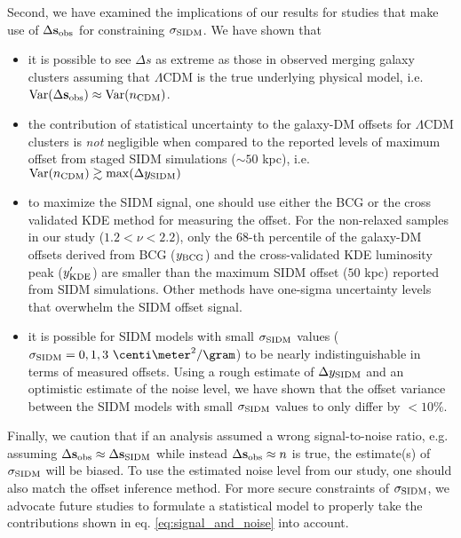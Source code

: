 Second, we have examined the implications of our results for studies that make use of
$\Delta {\bf s}_{\rm obs}$ for constraining $\sigma_{\rm SIDM}$. We have shown that 
\begin{itemize}
		\item it is possible to see $\Delta s$ as extreme as those in observed merging 
			galaxy clusters assuming that $\Lambda$CDM is the true underlying physical model, 
	i.e. $\mathrm{Var}(\Delta {\bf s}_{\rm obs}) \approx \mathrm{Var}(n_{\rm CDM})$.\\

		\item the contribution of statistical uncertainty to the galaxy-DM offsets 
			for $\Lambda$CDM clusters is {\it not} negligible when compared to the reported  
			levels of maximum offset from staged SIDM simulations ($\sim 50$ kpc),
			i.e. $\mathrm{Var}(n_{\rm CDM}) \gtrsim \max(\Delta y_{{\rm SIDM}})$
			\\ 
		
		\item to maximize the SIDM signal, one should use either the BCG or the
			cross validated KDE method for measuring the offset.
			For the non-relaxed samples in our study ($1.2 < \nu < 2.2$),
		  only the 68-th percentile of the galaxy-DM offsets derived from BCG ($y_{\rm BCG}$) and 
			the cross-validated KDE luminosity peak	($y_{\rm KDE}'$)
			are smaller than the maximum SIDM offset ($50$ kpc) reported from SIDM simulations. 
			Other methods have one-sigma uncertainty levels that overwhelm the
			SIDM offset signal.\\ 

		\item it is possible for SIDM models with small $\sigma_{\rm SIDM}$ values 
			($\sigma_\SIDM = 0, 1, 3~\centi\meter^2 / \gram$) to be
			nearly indistinguishable in terms of measured offsets. 
			Using a rough estimate of $\Delta y_{\rm SIDM}$ and an optimistic estimate of the
			noise level, we have shown that the offset variance between the
			SIDM models with small $\sigma_{\rm SIDM}$ values to only differ by $< 10\%$.

\end{itemize}
Finally, we caution that if an analysis assumed a wrong signal-to-noise ratio, e.g.
assuming $\Delta {\bf s}_{\rm obs} \approx \Delta {\bf s}_{\rm SIDM}$ while instead $\Delta {\bf s}_{\rm obs}
\approx n$ is true, the estimate(s) of $\sigma_{\rm SIDM}$ will be biased.
To use the estimated noise level from our study, one should also match the
offset inference method.
For more secure constraints of $\sigma_{\rm SIDM}$,
we advocate future studies to formulate a statistical model 
to properly take the contributions shown in eq. \ref{eq:signal_and_noise} into 
account.

